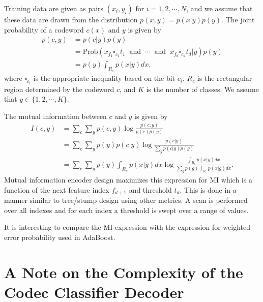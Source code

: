 \documentclass{article}
\begin{document}
Training data are given as pairs $(x_i, y_i)$ for $i=1, 2, \cdots, N$, and we assume that these data are drawn from the distribution $p(x,y) = p(x|y)p(y)$.  The joint probability of a codeword $c(x)$ and $y$ is given by
\begin{align*}
p(c,y) &= p(c|y) p(y) \\
&= \text{Prob}(x_{f_1} \square_{c_1} t_1 \;\; \text{and} \;\; \cdots \;\; \text{and} \;\; x_{f_d} \square_{c_d} t_d | y) p(y) \\
&= p(y) \int_{R_{c}} p(x|y) dx,
\end{align*}
where $\square_{c_i}$ is the appropriate inequality based on the bit $c_i$, $R_{c}$ is the rectangular region determined by the codeword $c$, and $K$ is the number of classes.  We assume that $y \in \{1, 2, \cdots, K\}$.  

The mutual information between $c$ and $y$ is given by
\begin{align*}
I(c,y) &= \sum_c \sum_y p(c,y) \log \frac{p(c,y)}{p(c) p(y)} \\
&= \sum_c \sum_y p(y) p(c|y) \log \frac{p(c|y)}{\sum_g p(c|g) p(g)} \\
&= \sum_c \sum_y p(y) \int_{R_c} p(x|y) dx \log \frac{\int_{R_c} p(x|y) dx}{\sum_g p(g) \int_{R_c} p(x|g)dx}.
\end{align*}
Mutual information encoder design maximizes this expression for MI which is a function of the next feature index $f_{d+1}$ and threshold $t_d$.  This is done in a manner similar to tree/stump design using other metrics.  A scan is performed over all indexes and for each index a threshold is swept over a range of values.

It is interesting to compare the MI expression with the expression for weighted error probability used in AdaBoost.

\section{A Note on the Complexity of the Codec Classifier Decoder}
\end{document}
